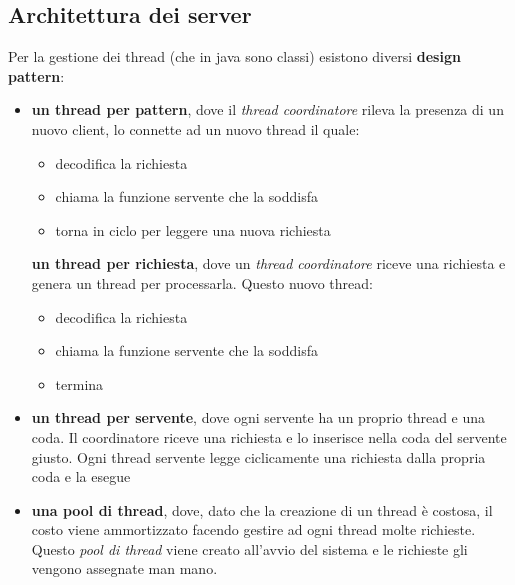 \documentclass[a4paper,12pt, oneside]{book}
\begin{document}
\subsection{Architettura dei server}
Per la gestione dei thread (che in java sono classi) esistono diversi \textbf{design pattern}:
\begin{itemize}
\item \textbf{un thread per pattern}, dove il \textit{thread coordinatore} rileva la presenza di un nuovo client, lo connette ad un nuovo thread il quale:
\begin{itemize}
\item decodifica la richiesta
\item chiama la funzione servente che la soddisfa
\item torna in ciclo per leggere una nuova richiesta
\end{itemize}
\textbf{un thread per richiesta}, dove un \textit{thread coordinatore} riceve una richiesta e genera un thread per processarla. Questo nuovo thread:
\begin{itemize}
\item decodifica la richiesta
\item chiama la funzione servente che la soddisfa
\item termina
\end{itemize} 
\item \textbf{un thread per servente}, dove ogni servente ha un proprio thread e una coda. Il coordinatore riceve una richiesta e lo inserisce nella coda del servente giusto. Ogni thread servente legge ciclicamente una richiesta dalla
propria coda e la esegue
\item \textbf{una pool di thread}, dove, dato che la creazione di un thread è costosa, il costo viene ammortizzato facendo gestire ad ogni thread molte richieste. Questo \textit{pool di thread} viene creato all'avvio del sistema e le richieste gli vengono assegnate man mano.
\end{itemize}
\end{document}
